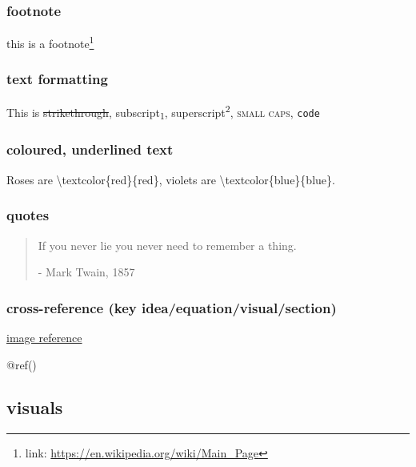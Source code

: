 \documentclass[
]{article}
\begin{document}
\hypertarget{footnote}{%
\subsubsection{footnote}\label{footnote}}

this is a footnote\footnote{link:
  \url{https://en.wikipedia.org/wiki/Main_Page}}

\hypertarget{text-formatting}{%
\subsubsection{text formatting}\label{text-formatting}}

This is \sout{strikethrough}, subscript\textsubscript{1},
superscript\textsuperscript{2}, \textsc{small caps,} \texttt{code}

\hypertarget{coloured-underlined-text}{%
\subsubsection{coloured, underlined
text}\label{coloured-underlined-text}}

Roses are \textbackslash textcolor\{red\}\{red\}, violets are
\textbackslash textcolor\{blue\}\{blue\}.

\hypertarget{quotes}{%
\subsubsection{quotes}\label{quotes}}

\begin{quote}
If you never lie you never need to remember a thing.

- Mark Twain, 1857
\end{quote}

\hypertarget{cross-reference-key-ideaequationvisualsection}{%
\subsubsection{cross-reference (key
idea/equation/visual/section)}\label{cross-reference-key-ideaequationvisualsection}}

\protect\hyperlink{river}{image reference}

@ref()

\hypertarget{visuals}{%
\subsection{visuals}\label{visuals}}
\end{document}
